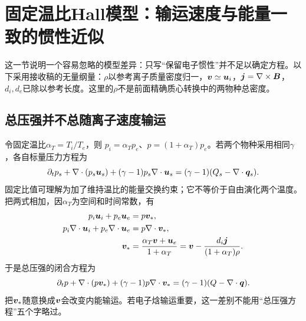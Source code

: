 \section{固定温比Hall模型：输运速度与能量一致的惯性近似}
这一节说明一个容易忽略的模型差异：只写“保留电子惯性”并不足以确定方程。以下采用\citet{L296}接收稿的无量纲量：$\rho$以参考离子质量密度归一，$\bm{v}\simeq\bm{u}_i$，$\bm{j}=\nabla\times\bm{B}$，$d_i,d_e$已除以参考长度。这里的$\rho$不是前面精确质心转换中的两物种总密度。

\subsection{总压强并不总随离子速度输运}
令固定温比$\alpha_T=T_i/T_e$，则
$p_i=\alpha_Tp_e$、$p=(1+\alpha_T)p_e$。若两个物种采用相同$\gamma$，各自标量压力方程为
\begin{equation}
 \partial_tp_s+\nabla\cdot(p_s\bm{u}_s)
 +(\gamma-1)p_s\nabla\cdot\bm{u}_s
 =(\gamma-1)(Q_s-\nabla\cdot\bm{q}_s).
\end{equation}
固定比值可理解为加了维持温比的能量交换约束；它不等价于自由演化两个温度。把两式相加，因$\alpha_T$为空间和时间常数，有
\begin{align}
 p_i\bm{u}_i+p_e\bm{u}_e&=p\bm{v}_*,\\
 p_i\nabla\cdot\bm{u}_i+p_e\nabla\cdot\bm{u}_e&=p\nabla\cdot\bm{v}_*,\\
 \bm{v}_*&=\frac{\alpha_T\bm{v}+\bm{u}_e}{1+\alpha_T}
 =\bm{v}-\frac{d_i\bm{j}}{(1+\alpha_T)\rho}.
\end{align}
于是总压强的闭合方程为
\begin{equation}
 \partial_tp+\nabla\cdot(p\bm{v}_*)
 +(\gamma-1)p\nabla\cdot\bm{v}_*
 =(\gamma-1)(Q-\nabla\cdot\bm{q}).
\end{equation}
把$\bm{v}_*$随意换成$\bm{v}$会改变内能输运。若电子焓输运重要，这一差别不能用“总压强方程”五个字略过。

